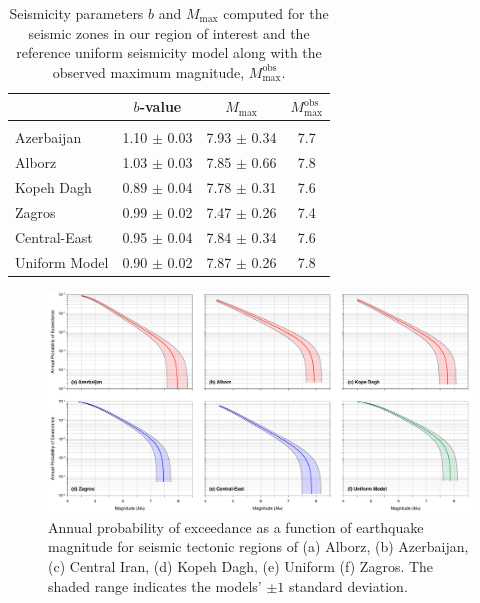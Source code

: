 
\begin{table}[t]
    \centering
    \caption{Seismicity parameters $b$ and $M_{\max}$ computed for the seismic zones in our region of interest and the reference uniform seismicity model along with the observed maximum magnitude, $M_{\max}^{\mathrm{obs}}$.}
    \begin{tabular}{lccc}
        \cline{2-4}                                                                         \\[-1.6ex]
                        & $b$-value         & $M_{\max}$        & $M_{\max}^{\mathrm{obs}}$ \\[0.6ex]
        \hline                                                                              \\[-1.6ex]
        Azerbaijan      & 1.10 $\pm$ 0.03   & 7.93 $\pm$ 0.34   & 7.7                       \\
        Alborz          & 1.03 $\pm$ 0.03   & 7.85 $\pm$ 0.66   & 7.8                       \\
        Kopeh Dagh      & 0.89 $\pm$ 0.04   & 7.78 $\pm$ 0.31   & 7.6                       \\
        Zagros          & 0.99 $\pm$ 0.02   & 7.47 $\pm$ 0.26   & 7.4                       \\
        Central-East    & 0.95 $\pm$ 0.04   & 7.84 $\pm$ 0.34   & 7.6                       \\
        Uniform Model   & 0.90 $\pm$ 0.02   & 7.87 $\pm$ 0.26   & 7.8                       \\[0.5ex]
        \hline 
    \end{tabular}
    \label{tab:params} 
\end{table}

\begin{figure}[t]
    \centering
    \includegraphics[width=\textwidth]{figures/pdf/figure-04} 
    \caption{Annual probability of exceedance as a function of earthquake magnitude for seismic tectonic regions of (a) Alborz, (b) Azerbaijan, (c) Central Iran, (d) Kopeh Dagh, (e) Uniform (f) Zagros. The shaded range indicates the models' $\pm 1$ standard deviation.}
    \label{fig:annualp}
\end{figure}

